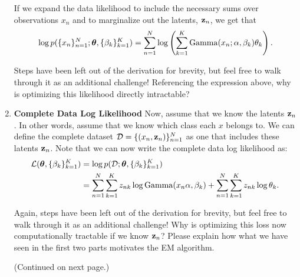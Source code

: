 \documentclass[submit]{harvardml}
\begin{document}
\begin{problem}
\begin{enumerate}
    If we expand the data
    likelihood to include the necessary sums over observations
    $x_n$ and to marginalize out the latents,
    $\mathbf{z}_n$, we get that $$\log
    p(\{x_n\}^N_{n=1}; \boldsymbol{\theta}, \{\beta_k\}^K_{k = 1}) = \sum_{n = 1}^N \log \left( \sum_{k = 1}^K \operatorname{Gamma}(x_n; \alpha, \beta_k)  \theta_k  \right).$$
    
    Steps have been left out of the derivation for brevity, but feel free to walk through it as an additional challenge! Referencing the expression above, why is optimizing this likelihood directly intractable?

\item \textbf{Complete Data Log Likelihood} Now, assume that we know the latents $\mathbf{z}_n$. In other words, assume that we know which class each $x$ belongs to. We can define the complete dataset
  $\mathcal D = \{(x_n, \mathbf{z}_n)\}_{n=1}^N$ as one that includes these latents $\mathbf{z}_n$. Note that we can now write the complete data log likelihood as: 
  \begin{align*}
      \mathcal{L}(\boldsymbol{\theta}, \{\beta_k\}^K_{k=1}) &=  \log p(\mathcal D; \boldsymbol{\theta}, \{\beta_k\}^K_{k=1}) \\
      &= \sum_{n = 1}^N \sum_{k = 1}^K z_{nk} \log \operatorname{Gamma}(x_n \alpha, \beta_k) + \sum_{n = 1}^N \sum_{k = 1}^K z_{nk} \log\theta_k.
  \end{align*}

  Again, steps have been left out of the derivation for brevity, but feel free to walk through it as an additional challenge! Why is optimizing this loss now computationally tractable if we know $\mathbf{z}_n$? Please explain how what we have seen in the first two parts motivates the EM algorithm.

  (Continued on next page.)

\end{enumerate}

\end{problem}

\newpage
\end{document}
